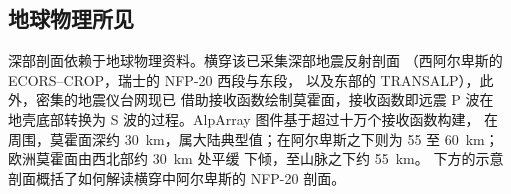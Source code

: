 \subsection*{地球物理所见}

深部剖面依赖于地球物理资料。横穿该已采集深部地震反射剖面
（西阿尔卑斯的 ECORS--CROP，瑞士的 NFP-20 西段与东段，
以及东部的 TRANSALP），此外，密集的地震仪台网现已
借助接收函数绘制莫霍面，接收函数即远震 P 波在
地壳底部转换为 S 波的过程。AlpArray 图件基于超过十万个接收函数构建，
在周围，莫霍面深约 \qty{30}{km}，属大陆典型值；在阿尔卑斯之下则为 55 至
\qty{60}{km}；欧洲莫霍面由西北部约 \qty{30}{km} 处平缓
下倾，至山脉之下约 \qty{55}{km}。
下方的示意剖面概括了如何解读横穿中阿尔卑斯的 NFP-20
剖面。

